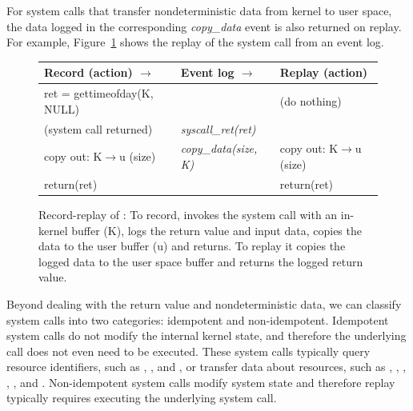 For system calls that transfer nondeterministic data from kernel to
user space, the data logged in the corresponding {\em copy\_data}
event is also returned on replay.  For example,
Figure~\ref{scribe:fig:recplay} shows the replay of the  
system call from an event log.

\begin{figure}[t]
  \small
  \begin{center}
  \begin{tabular}{lll}

    \hline	

    {\bf Record (action) \hfill $\rightarrow$ }
      & {\bf Event log \hfill $\rightarrow$ }
        & {\bf Replay (action)}
            \\

    \hline	

    ret = gettimeofday(K, NULL)
      &
        & (do nothing)
            \\

    (system call returned)
      & {\em syscall\_ret(ret)}
        &
            \\

    copy out: K$\rightarrow$u (size)
      & {\em copy\_data(size, K)}
        & copy out: K$\rightarrow$u (size)
            \\

    return(ret)
      &
        & return(ret)
            \\

    \hline	

  \end{tabular}
  \end{center}

  \caption{Record-replay of :
    { 
      To record, \scribe{} invokes the system call with an in-kernel
      buffer (K), logs the return value and input data, copies the
      data to the user buffer (u) and returns. To replay it copies
      the logged data to the user space buffer and returns the logged
      return value.
    }
  }
  \label{scribe:fig:recplay}
\end{figure}

Beyond dealing with the return value and nondeterministic data, we can
classify system calls into two categories: idempotent and non-idempotent.
Idempotent system calls do not modify the internal kernel state, and
therefore the underlying call does not even need to be executed. These
system calls typically query resource identifiers, such
as , ,  and , or 
transfer data about resources, such as , , 
, , ,
and .  Non-idempotent system calls modify system state
and therefore replay typically requires executing the underlying
system call. 

